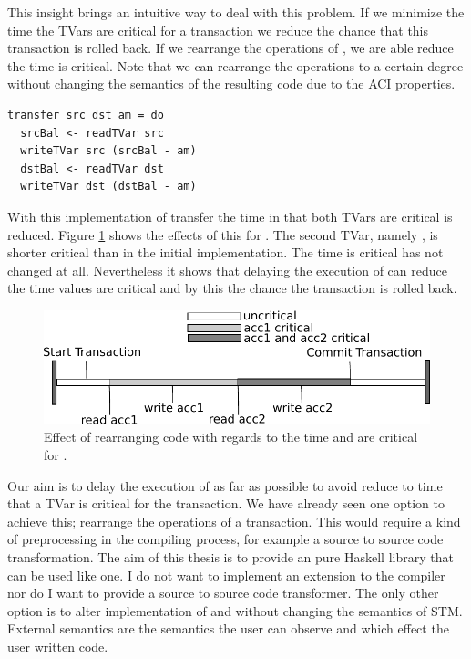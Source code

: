 This insight brings an intuitive way to deal with this problem. If we minimize the time the TVars are critical for
a transaction we reduce the chance that this transaction is rolled back. 
If we rearrange the operations of , we are able reduce the time  is critical. Note that we 
can rearrange the operations to a certain degree without changing the semantics of the resulting code due to the ACI 
properties. 
\begin{lstlisting}
transfer src dst am = do 
  srcBal <- readTVar src
  writeTVar src (srcBal - am)
  dstBal <- readTVar dst
  writeTVar dst (dstBal - am)
\end{lstlisting}
With this implementation of transfer the time in that both TVars are critical is reduced. Figure \ref{fig:criticalValue2}
shows the effects of this for . The second TVar, namely , is shorter critical than in the 
initial implementation. The time  is critical has not changed at all. Nevertheless it shows that delaying the
execution of  can reduce the time values are critical and by this the chance the transaction is rolled back.
\begin{figure}
\centering
\includegraphics{Figures/CriticalValue2}
\decoRule
\caption[CriticalValue2]{Effect of rearranging code with regards to the time  and  are critical for .}
\label{fig:criticalValue2}
\end{figure}
Our aim is to delay the execution of  as far as possible to avoid reduce to time that
a TVar is critical for the transaction. We have already seen one option to achieve this; rearrange the 
operations of a transaction. This would require a kind of preprocessing in the compiling process, for 
example a source to source code transformation. The aim of this thesis is to provide an pure Haskell
library that can be used like one. I do not want to implement an extension to the compiler nor do I 
want to provide a source to source code transformer. The only other option is to alter implementation
of  and  without changing the  semantics of STM. 
External semantics are the semantics the user can observe and which effect the user written code.

